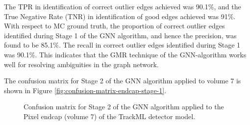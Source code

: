 The TPR in identification of correct outlier edges achieved was 90.1\%, and the True Negative Rate (TNR) in identification of good edges achieved was 91\%. With respect to MC ground truth, the proportion of correct outlier edges identified during Stage 1 of the GNN algorithm, and hence the precision, was found to be 85.1\%. The recall in correct outlier edges identified during Stage 1 was 90.1\%. This indicates that the GMR technique of the GNN-algorithm works well for resolving ambiguities in the graph network.

The confusion matrix for Stage 2 of the GNN algorithm applied to volume 7 is shown in Figure \ref{fig:confusion-matrix-endcap-stage-1}.

\begin{figure}[htbp]%
    \centering
    \caption{Confusion matrix for Stage 2 of the GNN algorithm applied to the Pixel endcap (volume 7) of the TrackML detector model.}
    \label{fig:confusion-matrix-endcap-stage-2}
\end{figure}

